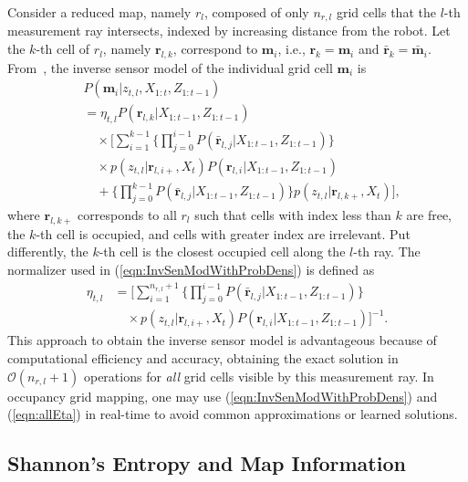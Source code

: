 \documentclass[letterpaper, 10pt, conference]{ieeeconf}
\newcommand{\refeqn}[1]{(\ref{eqn:#1})}
\begin{document}
Consider a reduced map, namely $r_l$, composed of only $n_{r,l}$ grid cells that the $l$-th measurement ray intersects, indexed by increasing distance from the robot. Let the $k$-th cell of $r_l$, namely $\mathbf{r}_{l,k}$, correspond to $\mathbf{m}_i$, i.e., $\mathbf{r}_k=\mathbf{m}_i$ and $\bar{\mathbf{r}}_k=\bar{\mathbf{m}}_i$.
From~\cite{KauLeeAiMos16}, the inverse sensor model of the individual grid cell $\mathbf{m}_i$ is
\begin{align}
\label{eqn:InvSenModWithProbDens}
&P(\mathbf{m}_i|z_{t,l},X_{1:t},Z_{1:t-1})\nonumber
\\
&=\eta_{t,l}
P(\mathbf{r}_{l,k}|X_{1:t-1},Z_{1:t-1})\nonumber\\
&\quad\times \bigg[\sum_{i=1}^{k-1}\bigg\{\prod_{j=0}^{i-1}P(\bar{\mathbf{r}}_{l,j}|X_{1:t-1},Z_{1:t-1})\bigg\}\nonumber\\
&\quad\times p(z_{t,l}|\mathbf{r}_{l,i+},X_t)P(\mathbf{r}_{l,i}|X_{1:t-1},Z_{1:t-1})\nonumber\\
&\quad + \bigg\{\prod_{j=0}^{k-1}P(\bar{\mathbf{r}}_{l,j}|X_{1:t-1},Z_{1:t-1})\bigg\}p(z_{t,l}|\mathbf{r}_{l,k+},X_t)
\bigg],
\end{align}
where $\mathbf{r}_{l,k+}$ corresponds to all $r_l$ such that cells with index less than $k$ are free, the $k$-th cell is occupied, and cells with greater index are irrelevant. Put differently, the $k$-th cell is the closest occupied cell along the $l$-th ray. The normalizer used in \refeqn{InvSenModWithProbDens} is defined as
\begin{align}
\label{eqn:allEta}
\eta_{t,l}
&=
\bigg[\sum_{i=1}^{n_{r,l}+1}\bigg\{\prod_{j=0}^{i-1}P(\bar{\mathbf{r}}_{l,j}|X_{1:t-1},Z_{1:t-1})\bigg\}\nonumber\\&\quad\times p(z_{t,l}|\mathbf{r}_{l,i+},X_t)P(\mathbf{r}_{l,i}|X_{1:t-1},Z_{1:t-1})\bigg]^{-1}.
\end{align}
This approach to obtain the inverse sensor model is advantageous because of computational efficiency and accuracy, obtaining the exact solution in $\mathcal O(n_{r,l}+1)$ operations for \emph{all} grid cells visible by this measurement ray. In occupancy grid mapping, one may use \refeqn{InvSenModWithProbDens} and \refeqn{allEta} in real-time to avoid common approximations or learned solutions.

\subsection{Shannon's Entropy and Map Information}
\end{document}
